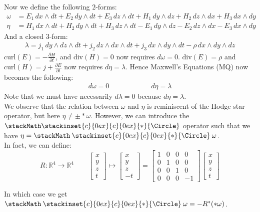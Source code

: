 \documentclass[15pt]{book}
\theoremstyle{break}
\theoremstyle{break}
\newcommand{\R}{\mathbb{R}}
\newcommand{\bmat}[1]{\begin{bmatrix} #1 \end{bmatrix}}
\newcommand\oast{\stackMath\mathbin{\stackinset{c}{0ex}{c}{0ex}{\ast}{\Circle}}}
\begin{document}
Now we define the following $2$-forms:
\begin{align*}
\omega&= E_1\, dx\wedge dt + E_2\, dy\wedge dt + E_3\, dz\wedge dt + H_1\, dy\wedge dz+ H_2\, dz\wedge dx + H_3\, dx\wedge dy\\
\eta &= H_1\, dx \wedge dt + H_2\, dy \wedge dt + H_3\, dz \wedge dt - E_1\, dy \wedge dz - E_2\, dz\wedge dx - E_3 \, dx \wedge dy \tag{WN}
\end{align*}
And a closed $3$-form: 
\begin{align*}
\lambda = j_1\, dy \wedge dz \wedge dt + j_2\, dz \wedge dx \wedge dt + j_3\, dx \wedge dy \wedge dt - \rho\, dx \wedge dy \wedge dz \tag{WN}
\end{align*}
$\text{curl}(E) = -\frac{\partial H}{\partial t}$, and $\text{div}(H) = 0$ now requires $d\omega = 0$. $\text{div}(E) = \rho$ and $\text{curl}(H) = j +\frac{\partial E}{\partial t}$ now requires $d\eta = \lambda$. Hence Maxwell's Equations (MQ) now becomes the following:
\begin{align*}
d\omega  = 0\qquad\qquad\qquad d\eta = \lambda \tag{MQ}
\end{align*}
Note that we must have necessarily $d\lambda = 0$ because $d\eta = \lambda$. \\

We observe that the relation between $\omega$ and $\eta$ is reminiscent of the Hodge star operator, but here $\eta \neq \pm *\omega$. However, we can introduce the $\oast$ operator such that we have $\eta = \oast \omega$.\\

In fact, we can define: $$R:\R^4 \to \R^4 \qquad \bmat{x\\y\\z\\t}\mapsto \bmat{x\\y\\z\\-t} = \bmat{1&0&0&0 \\ 0&1&0&0 \\ 0&0&1&0 \\ 0&0&0&-1}\bmat{x\\y\\z\\t}$$

In which case we get $\oast \omega = -R^*(*\omega)$.
\end{document}
